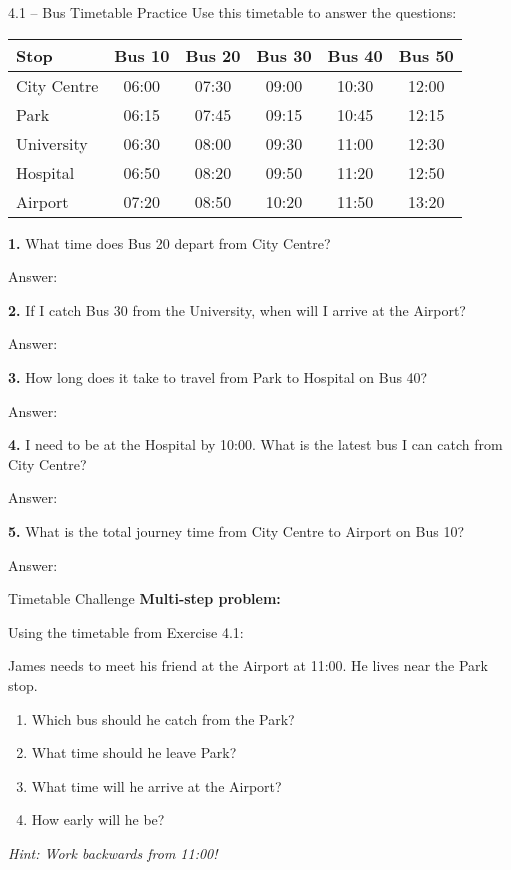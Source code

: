 \documentclass[12pt,a4paper]{article}
\begin{document}
\begin{exercisebox}{4.1 -- Bus Timetable Practice}
Use this timetable to answer the questions:

\begin{center}
\begin{tabular}{l|ccccc}
\toprule
\textbf{Stop} & \textbf{Bus 10} & \textbf{Bus 20} & \textbf{Bus 30} & \textbf{Bus 40} & \textbf{Bus 50} \\
\midrule
City Centre & 06:00 & 07:30 & 09:00 & 10:30 & 12:00 \\
Park & 06:15 & 07:45 & 09:15 & 10:45 & 12:15 \\
University & 06:30 & 08:00 & 09:30 & 11:00 & 12:30 \\
Hospital & 06:50 & 08:20 & 09:50 & 11:20 & 12:50 \\
Airport & 07:20 & 08:50 & 10:20 & 11:50 & 13:20 \\
\bottomrule
\end{tabular}
\end{center}

\textbf{1.} What time does Bus 20 depart from City Centre?

Answer: \underline{\hspace{4cm}}

\textbf{2.} If I catch Bus 30 from the University, when will I arrive at the Airport?

Answer: \underline{\hspace{4cm}}

\textbf{3.} How long does it take to travel from Park to Hospital on Bus 40?

Answer: \underline{\hspace{4cm}}

\textbf{4.} I need to be at the Hospital by 10:00. What is the latest bus I can catch from City Centre?

Answer: \underline{\hspace{4cm}}

\textbf{5.} What is the total journey time from City Centre to Airport on Bus 10?

Answer: \underline{\hspace{4cm}}
\end{exercisebox}

\begin{challengebox}{Timetable Challenge}
\textbf{Multi-step problem:}

Using the timetable from Exercise 4.1:

James needs to meet his friend at the Airport at 11:00. He lives near the Park stop.

\begin{enumerate}[label=\alph*)]
\item Which bus should he catch from the Park?
\item What time should he leave Park?
\item What time will he arrive at the Airport?
\item How early will he be?
\end{enumerate}

\textit{Hint: Work backwards from 11:00!}
\end{challengebox}
\end{document}
